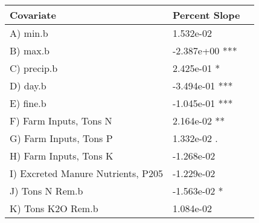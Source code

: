 \documentclass[paperwidth=42in,paperheight=44in]{baposter}
\begin{document}
\begin{poster}
{{\smaller
\begin{center}
\begin{tabular}{l l l}
\toprule
\textbf{Covariate} & \textbf{Percent Slope} \\
\midrule
A) min.b  & 1.532e-02 \\ %
B) max.b & -2.387e+00  *** \\ %
C) precip.b  & 2.425e-01  * \\ %
D) day.b  & -3.494e-01  *** \\ %
E) fine.b  & -1.045e-01  *** \\ %
F) Farm Inputs, Tons N \cite{nuGIS} & 2.164e-02  ** \\ %
G) Farm Inputs, Tons P \cite{nuGIS} & 1.332e-02  . \\ %
H) Farm Inputs, Tons K \cite{nuGIS} & -1.268e-02  \\ %
I) Excreted Manure Nutrients, P205 \cite{nuGIS} & -1.229e-02 \\ %
J) Tons N Rem.b  & -1.563e-02  * \\ %
K) Tons K2O Rem.b  & 1.084e-02 \\ %

\end{tabular}
\end{center}}}
\end{poster}
\end{document}
